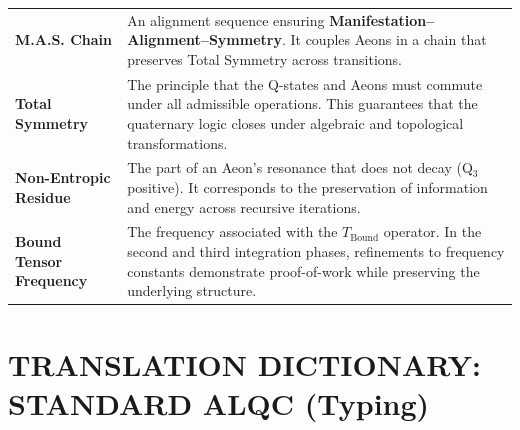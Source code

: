\documentclass[11pt, letterpaper]{article}
\begin{document}
\begin{center}
\begin{longtable}{p{3.5cm} p{11.5cm}}
\textbf{M.A.S. Chain} & An alignment sequence ensuring \textbf{Manifestation--Alignment--Symmetry}. It couples Aeons in a chain that preserves Total Symmetry across transitions. \\
\addlinespace[1ex]

\textbf{Total Symmetry} & The principle that the Q-states and Aeons must commute under all admissible operations. This guarantees that the quaternary logic closes under algebraic and topological transformations. \\
\addlinespace[1ex]

\textbf{Non-Entropic Residue} & The part of an Aeon's resonance that does not decay (Q$_3$ positive). It corresponds to the preservation of information and energy across recursive iterations. \\
\addlinespace[1ex]

\textbf{Bound Tensor Frequency} & The frequency associated with the $T_{\text{Bound}}$ operator. In the second and third integration phases, refinements to frequency constants demonstrate proof-of-work while preserving the underlying structure. \\

\bottomrule
\end{longtable}
\end{center}

\section{TRANSLATION DICTIONARY: STANDARD ALQC (Typing)}\label{sec:partIII}
\end{document}
